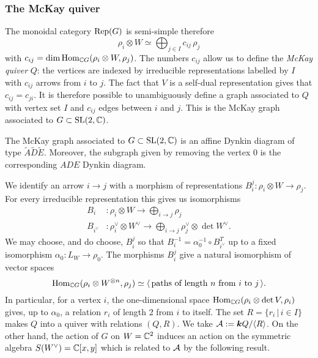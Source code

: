 \documentclass{amsart}
\theoremstyle{definition}
\begin{document}
\subsubsection{The McKay quiver}
The monoidal category $\operatorname{Rep}(G)$ is semi-simple therefore $$\rho_i \otimes W \simeq \bigoplus_{j \in I} c_{ij} \, \rho_j$$
with $c_{ij} =\dim \operatorname{Hom}_{\mathbb{C} G}(\rho_i \otimes W, \rho_j)$.
The numbers $c_{ij}$ allow us to define the {\em McKay quiver} $Q$: the vertices are indexed by irreducible representations labelled by $I$ with $c_{ij}$  arrows from $i$ to $j$.
The fact that $V$ is a self-dual representation gives that $c_{ij} = c_{ji}$.
It is therefore possible to unambiguously define a graph associated to $Q$ with vertex set $I$ and $c_{ij}$ edges between $i$ and $j$.
This is the McKay graph associated to $G \subset \operatorname{SL}(2,\mathbb{C})$.

\begin{theorem}
The McKay graph associated to $G \subset \operatorname{SL}(2,\mathbb{C})$ is an affine Dynkin diagram of type $\widetilde{A}\widetilde{D}\widetilde{E}$.
Moreover, the subgraph given by removing the vertex $0$ is the corresponding $ADE$ Dynkin diagram.
\end{theorem}

We identify an arrow $i \rightarrow j$ with a morphism of representations $B_i^j \colon \rho_i \otimes W \rightarrow \rho_j$.
For every irreducible representation this gives us isomorphisms 
\begin{align}
    B_i &\colon \rho_i \otimes W \longrightarrow \bigoplus_{i \rightarrow j} \rho_j \\
    B_{i^\vee} &\colon \rho_i^\vee \otimes W^\vee \longrightarrow \bigoplus_{i \rightarrow j} \rho_j^\vee \otimes \det W^\vee.
\end{align}
We may choose, and do choose, $B_i^j$ so that $B_i^{-1} = \alpha_0^{-1} \circ B_{i^\vee}^T$ up to a fixed isomorphism $\alpha_0 \colon L_W \rightarrow \rho_0$.
The morphisms $B_i^j$ give a natural isomorphism of vector spaces $$\operatorname{Hom}_{\mathbb{C} G}(\rho_i \otimes W^{\otimes n}, \rho_j) \simeq \langle\, \text{paths of length }n \text{ from }i \text{ to } j\,\rangle.$$
In particular, for a vertex $i$, the one-dimensional space $\operatorname{Hom}_{\mathbb{C} G} (\rho_i \otimes \operatorname{det}{V}, \rho_i)$ gives, up to $\alpha_0$, a relation $r_i$ of length 2 from $i$ to itself.
The set $R = \{r_i \, |\, i \in I\}$ makes $Q$ into a quiver with relations $(Q, R)$. 
We take $\mathcal{A}:= {\boldsymbol{k}} Q/ \langle R\rangle$.
On the other hand, the action of $G$ on $W=\mathbb{C}^2$ induces an action on the symmetric algebra $S(W^\vee)=\mathbb{C}[x,y]$ which is related to $\mathcal{A}$ by the following result.
\end{document}
